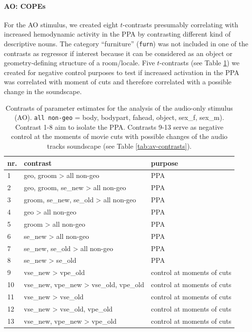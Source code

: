 \documentclass[english]{article}
\begin{document}
\paragraph{AO: COPEs}



For the AO stimulus, we created eight $t$-contrasts presumably correlating with
increased hemodynamic activity in the PPA by contrasting different kind of
descriptive nouns.
The category ``furniture'' (\texttt{furn}) was not included in one of the
contrasts as regressor if interest because it can be considered as an object or
geometry-defining structure of a room/locale.
Five $t$-contrasts (see Table \ref{tab:ao-contrasts}) we created for negative
control purposes to test if increased activation in the PPA was correlated with
moment of cuts and therefore correlated with a possible change in the
soundscape.


\begin{table}[t]
    \caption{Contrasts of parameter estimates for the analysis of
        the audio-only stimulus (AO).
\texttt{all non-geo} = body, bodypart, fahead, object, sex\_f, sex\_m).
Contrast 1-8 aim to isolate the PPA.
Contrasts 9-13 serve as negative control at the moments of movie cuts
with possible changes of the audio tracks soundscape (see Table
\ref{tab:av-contrasts}).}

\label{tab:ao-contrasts}
\footnotesize
\begin{tabular}{lll}
\toprule
\textbf{nr.} &  \textbf{contrast} & \textbf{purpose} \\
\midrule
1 & geo, groom > all non-geo & PPA \tabularnewline
2 & geo, groom, se\_new > all non-geo & PPA \tabularnewline
3 & groom, se\_new, se\_old > all non-geo & PPA \tabularnewline
4 & geo > all non-geo & PPA \tabularnewline
5 & groom > all non-geo & PPA \tabularnewline
6 & se\_new > all non-geo & PPA \tabularnewline
7 & se\_new, se\_old > all non-geo & PPA \tabularnewline
8 & se\_new > se\_old & PPA \tabularnewline
9 & vse\_new > vpe\_old & control at moments of cuts \tabularnewline
10 & vse\_new, vpe\_new > vse\_old, vpe\_old & control at moments of cuts \tabularnewline
11 & vse\_new > vse\_old & control at moments of cuts \tabularnewline
12 & vse\_new > vse\_old, vpe\_old & control at moments of cuts \tabularnewline
13 & vse\_new, vpe\_new > vpe\_old & control at moments of cuts \tabularnewline
\end{tabular}
\end{table}
\end{document}
